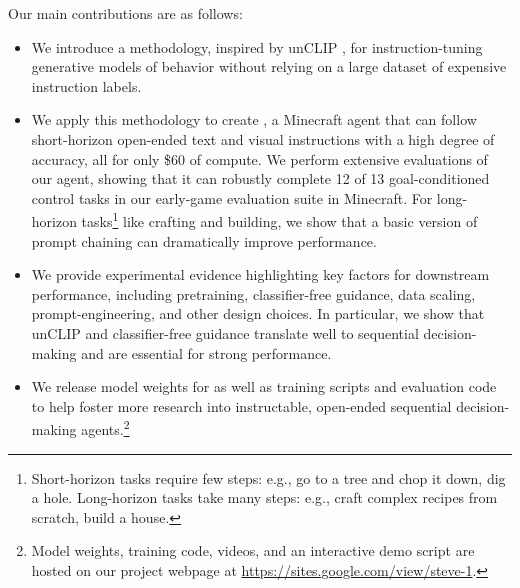 Our main contributions are as follows:
\vspace{-0.5em}
\begin{itemize}
    \item We introduce a methodology, inspired by unCLIP \citep{ramesh2022dalle2}, for instruction-tuning generative models of behavior without relying on a large dataset of expensive instruction labels.
    \item We apply this methodology to create \agentname{}, a Minecraft agent that can follow short-horizon open-ended text and visual instructions with a high degree of accuracy, all for only \$60 of compute. We perform extensive evaluations of our agent, showing that it can robustly complete 12 of 13 goal-conditioned control tasks in our early-game evaluation suite in Minecraft. For long-horizon tasks\footnote{Short-horizon tasks require few steps: e.g., go to a tree and chop it down, dig a hole. Long-horizon tasks take many steps: e.g., craft complex recipes from scratch, build a house.} like crafting and building, we show that a basic version of prompt chaining can dramatically improve performance.

    \item We provide experimental evidence highlighting key factors for downstream performance, including pretraining, classifier-free guidance, data scaling, prompt-engineering, and other design choices. In particular, we show that unCLIP \citep{ramesh2022dalle2} and classifier-free guidance \citep{cfg} translate well to sequential decision-making and are essential for strong performance.

    \item We release model weights for \agentname{} as well as training scripts and evaluation code to help foster more research into instructable, open-ended sequential decision-making agents.\footnote{Model weights, training code, videos, and an interactive demo script are hosted on our project webpage at \href{https://sites.google.com/view/steve-1}{https://sites.google.com/view/steve-1}.}
\end{itemize}
